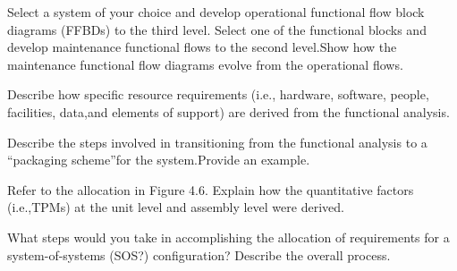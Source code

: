 \begin{exercises}
    \begin{exercise}
    \label{sea-4-1}
        Select a system of your choice and develop operational functional flow block diagrams (FFBDs) to the third level. Select one of the functional blocks and develop maintenance functional flows to the second level.Show how the maintenance functional flow diagrams evolve from the operational flows.
    \end{exercise}
    \begin{solution}
    \end{solution}
    
    \begin{exercise}
    \label{sea-4-2}
        Describe how specific resource requirements (i.e., hardware, software, people, facilities, data,and elements of support) are derived from the functional analysis.
    \end{exercise}
    \begin{solution}
    \end{solution}
    
    \begin{exercise}
    \label{sea-4-3}
        Describe the steps involved in transitioning from the functional analysis to a “packaging scheme”for the system.Provide an example.
    \end{exercise}
    \begin{solution}
    \end{solution}
    
    \begin{exercise}
    \label{sea-4-4}
        Refer to the allocation in Figure 4.6. Explain how the quantitative factors (i.e.,TPMs) at the unit level and assembly level were derived.
    \end{exercise}
    \begin{solution}
    \end{solution}
    
    \begin{exercise}
    \label{sea-4-5}
        What steps would you take in accomplishing the allocation of requirements for a system-of-systems (SOS?) configuration? Describe the overall process.
    \end{exercise}
    \begin{solution}
    \end{solution}
    

\end{exercises}
